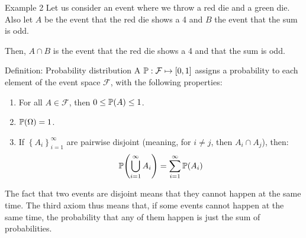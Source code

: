 \documentclass[a4paper]{article}
\begin{document}
\begin{parag}{Example 2}
    Let us consider an event where we throw a red die and a green die. Also let $A$ be the event that the red die shows a 4 and $B$ the event that the sum is odd.

    Then, $A \cap B$ is the event that the red die shows a 4 and that the sum is odd.
\end{parag}

\begin{parag}{Definition: Probability distribution}
    A  $\prob: \mathcal{F} \mapsto \left[0, 1\right]$ assigns a probability to each element of the event space $\mathcal{F}$, with the following properties:
    \begin{enumerate}
        \item For all $A \in \mathcal{F}$, then $0 \leq \prob\left(A\right) \leq 1$.
        \item $\prob\left(\Omega\right) = 1$.
        \item If $\left\{A_i\right\}_{i=1}^{\infty}$ are pairwise disjoint (meaning, for $i \neq j$, then $A_i \cap A_j$), then: 
        \[\prob\left(\bigcup_{i=1}^{\infty} A_i\right) = \sum_{i=1}^{\infty} \prob\left(A_i\right)\]
    \end{enumerate}

    The fact that two events are disjoint means that they cannot happen at the same time. The third axiom thus means that, if some events cannot happen at the same time, the probability that any of them happen is just the sum of probabilities.
\end{parag}
\end{document}
